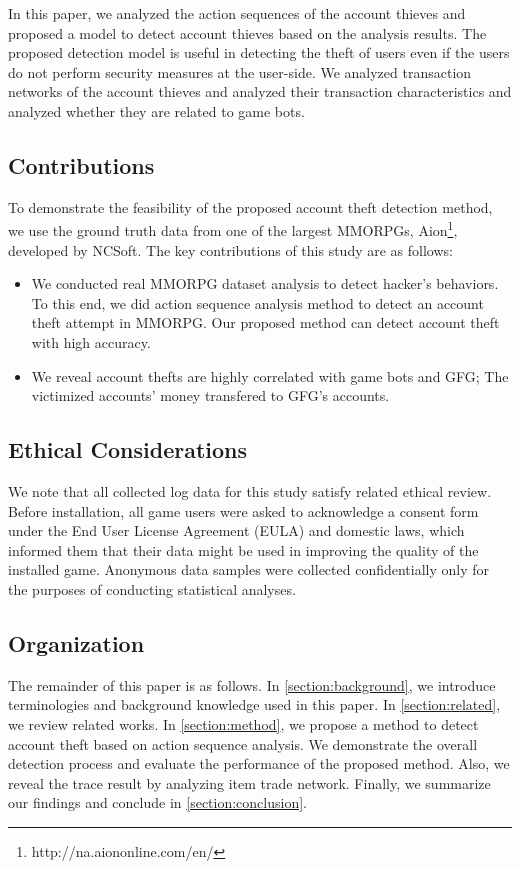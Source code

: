 \documentclass[conference]{IEEEtran}
\begin{document}
In this paper, we analyzed the action sequences of the account thieves and proposed a model to detect account thieves based on the analysis results. The proposed detection model is useful in detecting the theft of users even if the users do not perform security measures at the user-side. We analyzed transaction networks of the account thieves and analyzed their transaction characteristics and analyzed whether they are related to game bots.



\subsection{Contributions}
To demonstrate the feasibility of the proposed account theft detection method, we use the ground truth data from one of the largest MMORPGs, Aion\footnote{http://na.aiononline.com/en/}, developed by NCSoft. The key contributions of this study are as follows: 
\begin{itemize}
\item\texttt{} We conducted real MMORPG dataset analysis to detect hacker's behaviors. To this end, we did action sequence analysis method to detect an account theft attempt in MMORPG. Our proposed method can detect account theft with high accuracy.  
\item\texttt{} We reveal account thefts are highly correlated with game bots and GFG; The victimized accounts' money transfered to GFG's accounts.
\end{itemize} 


\subsection{Ethical Considerations}
We note that all collected log data for this study satisfy related ethical review. Before installation, all game users were asked to acknowledge a consent form under the End User License Agreement (EULA) and domestic laws, which informed them that their data might be used in improving the quality of the installed game. Anonymous data samples were collected confidentially only for the purposes of conducting statistical analyses. %

\subsection{Organization}
The remainder of this paper is as follows. In \textsection\ref{section:background}, we introduce terminologies and background knowledge used in this paper. In \textsection\ref{section:related}, we review  related works. In \textsection\ref{section:method}, we propose a method to detect account theft based on action sequence analysis. We demonstrate the overall detection process and evaluate the performance of the proposed method. Also, we reveal the trace result by analyzing item trade network. Finally, we summarize our findings and conclude in \textsection\ref{section:conclusion}. 
\end{document}
